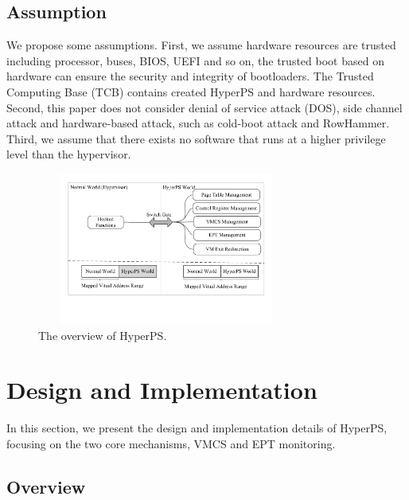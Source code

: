 \documentclass[conference]{IEEEtran}
\begin{document}
\subsection{Assumption}
We propose some assumptions.
First, we assume hardware resources are trusted including processor, buses, BIOS, UEFI and so on, the trusted boot based on hardware can ensure the security and integrity of bootloaders. The Trusted Computing Base (TCB) contains created HyperPS and hardware resources. Second, this paper does not consider denial of service attack (DOS), side channel attack and hardware-based attack, such as cold-boot attack and RowHammer. Third, we assume that there exists no software that runs at a higher privilege level than the hypervisor.



\begin{figure}
\centerline{\includegraphics[width=8.5cm, height=5cm]{overview-e.pdf}}%
\setlength{\abovecaptionskip}{3pt}
\setlength{\belowcaptionskip}{2pt}
\caption{The overview of HyperPS. } \label{fig1}
\end{figure}

\section{Design and Implementation}\label{sec:design}

In this section, we present the design and implementation
details of HyperPS, focusing on the two core mechanisms, VMCS and EPT monitoring.



\subsection{Overview} 
\end{document}
